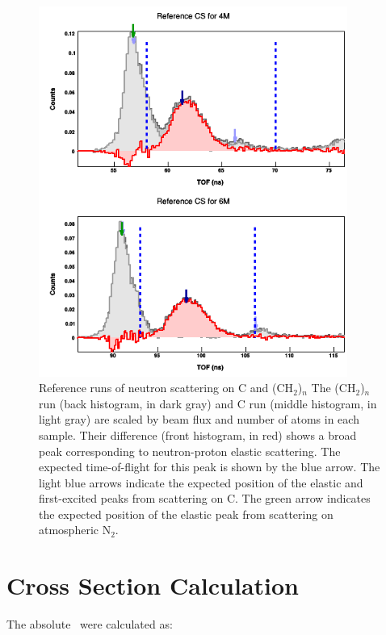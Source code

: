 \begin{figure}[ht!]
    \includegraphics[width = 0.9\textwidth]{figures/polyethyleneRef.png}
    \caption[Reference runs of neutron scattering on C and (CH$_{2}$)$_{n}$]
    {
        Reference runs of neutron scattering on C and (CH$_{2}$)$_{n}$
        The (CH$_{2}$)$_{n}$ run (back histogram, in dark gray) and C run
        (middle histogram, in light gray) are scaled by beam flux and number of
        atoms in each sample. Their difference (front histogram, in red) shows a
        broad peak corresponding to neutron-proton elastic scattering. The
        expected time-of-flight for this peak is shown by the blue arrow. The light blue arrows 
        indicate the expected position of the elastic and first-excited peaks
        from scattering on C. The green arrow indicates the expected position of
        the elastic peak from scattering on atmospheric N$_{2}$.
    }
    \label{polyethyleneRef}
\end{figure}

\section{Cross Section Calculation}

The absolute \el\ were calculated as:


